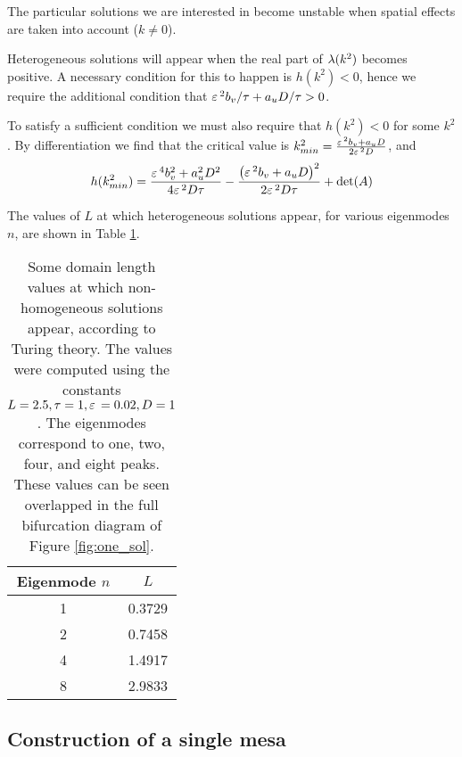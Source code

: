 The particular solutions we are interested in become unstable when spatial effects are taken into account ($k\neq 0$). 

Heterogeneous solutions will appear when the real part of $\lambda(k^2)$ becomes positive. A necessary condition for this to happen is $h(k^2)<0$, hence we require the additional condition that $\varepsilon\,^2b_v/\tau + a_uD/\tau>0$.

To satisfy a sufficient condition we must also require that $h(k^2)<0$ for some $k^2$. By differentiation we find that the critical value is $k^2_{min} = \frac{\varepsilon\,^2b_v + a_uD}{2\varepsilon\,^2D}$, and
% 
$$
h(k^2_{min}) = \frac{\varepsilon\,^4b_v^2 + a_u^2D^2}{4\varepsilon\,^2D\tau} - \frac{\left(\varepsilon\,^2b_v + a_uD\right)^2}{2\varepsilon\,^2D\tau} + \det(A)
$$

The values of $L$ at which heterogeneous solutions appear, for various eigenmodes $n$, are shown in Table \ref{tab:L_turing}.
% 
\begin{table}[h]
\begin{center}
\begin{tabular}{cc}
\toprule
\large{Eigenmode $n$} & \large{$L$}\\
\midrule
1 & 0.3729 \\
2 & 0.7458 \\
4 & 1.4917 \\
8 & 2.9833 \\
\bottomrule
\end{tabular}
\end{center}
\caption{Some domain length values at which non-homogeneous solutions appear, according to Turing theory. The values were computed using the constants $L=2.5,\tau=1,\varepsilon\,=0.02,D=1$. The eigenmodes correspond to one, two, four, and eight peaks. These values can be seen overlapped in the full bifurcation diagram of Figure \ref{fig:one_sol}.}
\label{tab:L_turing}
\end{table}
% 

\subsection{\label{section:construction}Construction of a single mesa}

